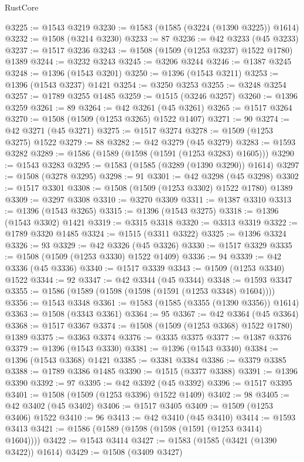 \begin{lexlean}{RustCore}
\begin{coremodule}
@3225 := @1543 @3219
@3230 := @1583 (@1585 (@3224 (@1390 @3225)) @1614)
@3232 := @1508 (@3214 @3230)
@3233 := 87
@3236 := @42 @3233 (@45 @3233)
@3237 := @1517 @3236
@3243 := @1508 (@1509 (@1253 @3237) @1522 @1780) @1389
@3244 := @3232 @3243
@3245 := @3206 @3244
@3246 := @1387 @3245
@3248 := @1396 (@1543 @3201)
@3250 := @1396 (@1543 @3211)
@3253 := @1396 (@1543 @3237) @1421
@3254 := @3250 @3253
@3255 := @3248 @3254
@3257 := @1789 @3255 @1485
@3259 := @1515 (@3246 @3257)
@3260 := @1396 @3259
@3261 := 89
@3264 := @42 @3261 (@45 @3261)
@3265 := @1517 @3264
@3270 := @1508 (@1509 (@1253 @3265) @1522 @1407)
@3271 := 90
@3274 := @42 @3271 (@45 @3271)
@3275 := @1517 @3274
@3278 := @1509 (@1253 @3275) @1522
@3279 := 88
@3282 := @42 @3279 (@45 @3279)
@3283 := @1593 @3282
@3289 := @1586 (@1589 (@1598 (@1591 (@1253 @3283) @1605)))
@3290 := @1543 @3283
@3295 := @1583 (@1585 (@3289 (@1390 @3290)) @1614)
@3297 := @1508 (@3278 @3295)
@3298 := 91
@3301 := @42 @3298 (@45 @3298)
@3302 := @1517 @3301
@3308 := @1508 (@1509 (@1253 @3302) @1522 @1780) @1389
@3309 := @3297 @3308
@3310 := @3270 @3309
@3311 := @1387 @3310
@3313 := @1396 (@1543 @3265)
@3315 := @1396 (@1543 @3275)
@3318 := @1396 (@1543 @3302) @1421
@3319 := @3315 @3318
@3320 := @3313 @3319
@3322 := @1789 @3320 @1485
@3324 := @1515 (@3311 @3322)
@3325 := @1396 @3324
@3326 := 93
@3329 := @42 @3326 (@45 @3326)
@3330 := @1517 @3329
@3335 := @1508 (@1509 (@1253 @3330) @1522 @1409)
@3336 := 94
@3339 := @42 @3336 (@45 @3336)
@3340 := @1517 @3339
@3343 := @1509 (@1253 @3340) @1522
@3344 := 92
@3347 := @42 @3344 (@45 @3344)
@3348 := @1593 @3347
@3355 := @1586 (@1589 (@1598 (@1598 (@1591 (@1253 @3348) @1604))))
@3356 := @1543 @3348
@3361 := @1583 (@1585 (@3355 (@1390 @3356)) @1614)
@3363 := @1508 (@3343 @3361)
@3364 := 95
@3367 := @42 @3364 (@45 @3364)
@3368 := @1517 @3367
@3374 := @1508 (@1509 (@1253 @3368) @1522 @1780) @1389
@3375 := @3363 @3374
@3376 := @3335 @3375
@3377 := @1387 @3376
@3379 := @1396 (@1543 @3330)
@3381 := @1396 (@1543 @3340)
@3384 := @1396 (@1543 @3368) @1421
@3385 := @3381 @3384
@3386 := @3379 @3385
@3388 := @1789 @3386 @1485
@3390 := @1515 (@3377 @3388)
@3391 := @1396 @3390
@3392 := 97
@3395 := @42 @3392 (@45 @3392)
@3396 := @1517 @3395
@3401 := @1508 (@1509 (@1253 @3396) @1522 @1409)
@3402 := 98
@3405 := @42 @3402 (@45 @3402)
@3406 := @1517 @3405
@3409 := @1509 (@1253 @3406) @1522
@3410 := 96
@3413 := @42 @3410 (@45 @3410)
@3414 := @1593 @3413
@3421 := @1586 (@1589 (@1598 (@1598 (@1591 (@1253 @3414) @1604))))
@3422 := @1543 @3414
@3427 := @1583 (@1585 (@3421 (@1390 @3422)) @1614)
@3429 := @1508 (@3409 @3427)

\end{coremodule}
\end{lexlean}
